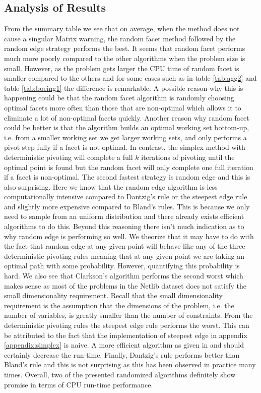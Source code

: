 \documentclass{standalone}
\begin{document}
  \subsection{Analysis of Results}
  From the summary table we see that on average, when the method does not cause a singular Matrix warning, the random facet method followed by the random edge strategy performs the best. It seems that random facet performs much more poorly compared to the other algorithms when the problem size is small. However, as the problem gets larger the CPU time of random facet is smaller compared to the others and for some cases such as in table \ref{tab:agg2} and table \ref{tab:boeing1} the difference is remarkable. A possible reason why this is happening could be that the random facet algorithm is randomly choosing optimal facets more often than those that are non-optimal which allows it to eliminate a lot of non-optimal facets quickly. Another reason why random facet could be better is that the algorithm builds an optimal working set bottom-up, i.e. from a smaller working set we get larger working sets, and only performs a pivot step fully if a facet is not optimal. In contrast, the simplex method with deterministic pivoting will complete a full $k$ iterations of pivoting until the optimal point is found but the random facet will only complete one full iteration if a facet is non-optimal. The second fastest strategy is random edge and this is also surprising. Here we know that the random edge algorithm is less computationally intensive compared to Dantzig's rule or the steepest edge rule and slightly more expensive compared to Bland's rules. This is because we only need to sample from an uniform distribution and there already exists efficient algorithms to do this. Beyond this reasoning there isn't much indication as to why random edge is performing so well. We theorize that it may have to do with the fact that random edge at any given point will behave like any of the three deterministic pivoting rules meaning that at any given point we are taking an optimal path with some probability. However, quantifying this probability is hard. We also see that Clarkson's algorithm performs the second worst which makes sense as most of the problems in the Netlib dataset \cite{netlibtest} does not satisfy the small dimensionality requirement. Recall that the small dimensionality requirement is the assumption that the dimensions of the problem, i.e. the number of variables, is greatly smaller than the number of constraints. From the deterministic pivoting rules the steepest edge rule performs the worst. This can be attributed to the fact that the implementation of steepest edge in appendix \ref{appendix:simplex} is naive. A more efficient algorithm as given in \cite{goldfarb1977practicable} and \cite{forrest1992steepest} should certainly decrease the run-time. Finally, Dantzig's rule performs better than Bland's rule and this is not surprising as this has been observed in practice many times. Overall, two of the presented randomized algorithms definitely show promise in terms of CPU run-time performance.\par
\end{document}
